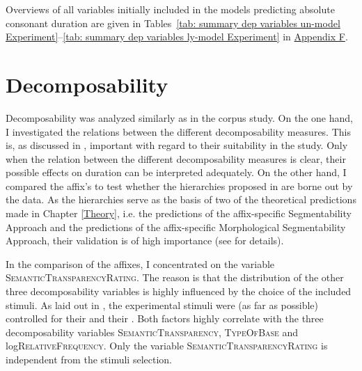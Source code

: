 Overviews of all variables initially included in the models predicting absolute consonant duration are given in Tables~\ref{tab: summary dep variables un-model Experiment}--\ref{tab: summary dep variables ly-model Experiment} in \hyperref[Appendix F Summaries of variables in initial models of experimental study]{Appendix F}.



\section{Decomposability} \label{decomposability experiment}


 

Decomposability was analyzed similarly as in the corpus study. On the one hand, I investigated the relations between the different decomposability measures. This is, as discussed in , important with regard to their suitability in the study. Only when the relation between the different decomposability measures is clear, their possible effects on duration can be interpreted adequately.  
On the other hand, I compared the affix's  to test whether the  hierarchies proposed in  are borne out by the data.  As the hierarchies serve as the basis of two of the theoretical predictions made in Chapter \ref{Theory}, i.e. the predictions of the affix-specific Segmentability Approach and the predictions of the affix-specific Morphological Segmentability Approach, their validation is of high importance (see  for details). 




In the  comparison of the affixes, I concentrated on the variable \textsc{SemanticTransparencyRating}. The reason is that the distribution of the other three decomposability variables is highly influenced by the choice of the included stimuli. 
 As laid out in , the experimental stimuli were (as far as possible) controlled for their   and their . Both factors highly correlate with the three decomposability variables \textsc{SemanticTransparency}, \textsc{TypeOfBase} and log\textsc{RelativeFrequency}. 
 Only the variable \textsc{SemanticTransparencyRating} is independent from the stimuli selection.



